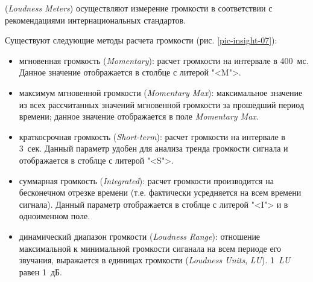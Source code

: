 \documentclass{beamer}
\begin{document}
\begin{frame}
(\textit{Loudness Meters}) осуществляют измерение громкости в соответствии с рекомендациями интернациональных стандартов. 

Существуют следующие методы расчета громкости (рис. \ref{pic-insight-07}):
\begin{itemize}
\item мгновенная громкость (\textit{Momentary}): расчет громкости на интервале в 400~мс. Данное значение отображается в столбце с литерой "<M">. 
\item максимум мгновенной громкости (\textit{Momentary Max}): максимальное значение из всех рассчитанных значений мгновенной громкости за прошедший период времени; данное значение отображается в поле \textit{Momentary Max}. 
\item краткосрочная громкость (\textit{Short-term}): расчет громкости на интервале в 3~сек.  Данный параметр удобен для анализа тренда громкости сигнала и отображается в стоблце с литерой "<S">.
\item суммарная громкость (\textit{Integrated}): расчет громкости производится на бесконечном отрезке времени (т.е. фактически усредняется на всем времени сигнала). Данный параметр отображается в стоблце с литерой "<I"> и в одноименном поле.
\end{itemize}
\end{frame}

\begin{frame}
\begin{itemize}
\item динамический диапазон громкости (\textit{Loudness Range}): отношение максимальной к минимальной громкости сиганала на всем периоде его звучания, выражается в единицах громкости (\textit{Loudness Units}, \textit{LU}). 1~\textit{LU} равен 1~дБ.
\end{itemize}
\end{frame}
\end{document}
